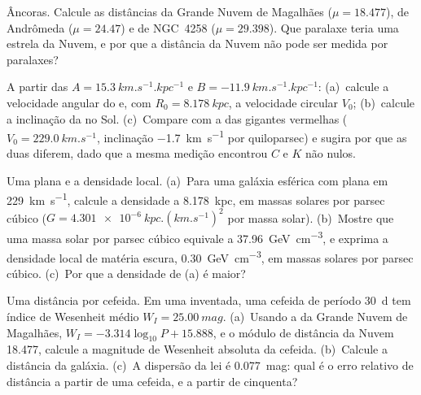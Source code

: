 \begin{exercise}[$\star$]\label{exo:b3:milky-way-galaxies:4}
Âncoras. Calcule as distâncias da Grande Nuvem de Magalhães
($\mu = 18.477$), de Andrômeda ($\mu = 24.47$) e de NGC~4258
($\mu = 29.398$). Que paralaxe teria uma estrela da Nuvem, e por que a
distância da Nuvem não pode ser medida por paralaxes?
\end{exercise}

\begin{exercise}[$\star\star$]\label{exo:b3:milky-way-galaxies:5}
A partir das  $A = \qty{15.3}{km.s^{-1}.kpc^{-1}}$ e
$B = \qty{-11.9}{km.s^{-1}.kpc^{-1}}$: (a)~calcule a velocidade angular do
 e, com $R_0 = \qty{8.178}{kpc}$, a velocidade circular $V_0$;
(b)~calcule a inclinação da  no Sol. (c)~Compare
com a  das gigantes vermelhas ($V_0 = \qty{229.0}{km.s^{-1}}$,
inclinação \qty{-1.7}{km.s^{-1}} por quiloparsec) e sugira por que as duas
diferem, dado que a mesma medição encontrou $C$ e $K$ não nulos.
\end{exercise}

\begin{exercise}[$\star\star$]\label{exo:b3:milky-way-galaxies:6}
Uma  plana e a densidade local. (a)~Para uma galáxia esférica
com  plana em \qty{229}{km.s^{-1}}, calcule a densidade a
\qty{8.178}{kpc}, em massas solares por parsec cúbico
($G = \qty{4.301e-6}{kpc.(km.s^{-1})^2}$ por massa solar). (b)~Mostre que
uma massa solar por parsec cúbico equivale a \qty{37.96}{GeV.cm^{-3}}, e exprima
a densidade local de matéria escura, \qty{0.30}{GeV.cm^{-3}}, em massas solares
por parsec cúbico. (c)~Por que a densidade de (a) é maior?
\end{exercise}

\begin{exercise}[$\star\star$]\label{exo:b3:milky-way-galaxies:7}
Uma distância por cefeida. Em uma  inventada, uma cefeida de
período \qty{30}{d} tem índice de Wesenheit médio $W_I = \qty{25.00}{mag}$.
(a)~Usando a  da Grande Nuvem de Magalhães,
$W_I = -3.314\log_{10}P + 15.888$, e o módulo de distância da Nuvem
18.477, calcule a magnitude de Wesenheit absoluta da cefeida. (b)~Calcule
a distância da galáxia. (c)~A dispersão da lei é \qty{0.077}{mag}: qual é
o erro relativo de distância a partir de uma cefeida, e a partir de cinquenta?
\end{exercise}

